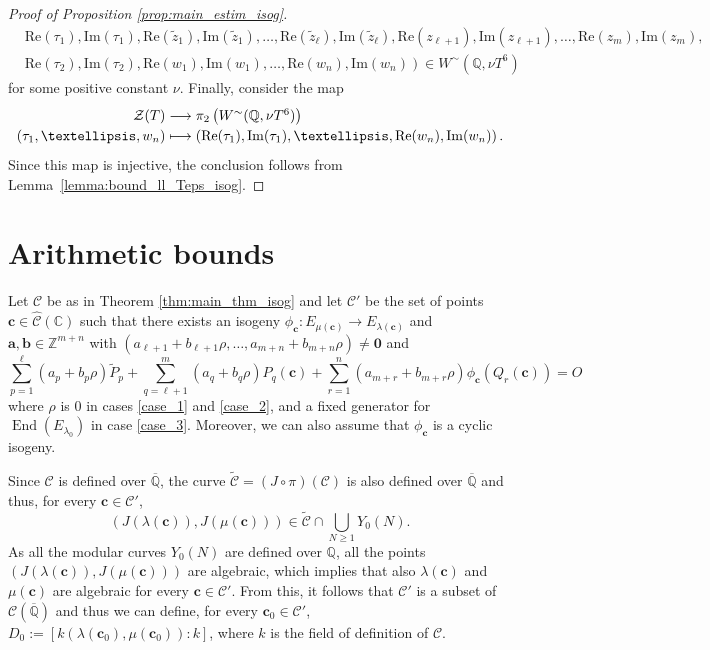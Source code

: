 \documentclass[11pt,a4paper,reqno]{amsart}
\numberwithin{equation}{section}
\newcommand{\Z}{\mathbb{Z}}
\newcommand{\Q}{\mathbb{Q}}
\newcommand{\C}{\mathbb{C}}
\newcommand{\Qal}{\overline{\mathbb{Q}}}
\renewcommand{\c}{\mathcal{C}}
\newcommand{\cc}{\mathbf{c}}
\renewcommand{\l}{\lambda}
\newcommand{\m}{\mu}
\renewcommand{\r}{\rho}
\newcommand{\pt}[1]{\left( #1 \right)}
\newcommand{\pq}[1]{\left[ #1 \right]}
\renewcommand{\Im}{\mathrm{Im}}
\renewcommand{\Re}{\mathrm{Re}}
\DeclareMathOperator{\en}{End}
\theoremstyle{remark}
\theoremstyle{definition}
\theoremstyle{definition}
\begin{document}
\begin{proof}[Proof of Proposition \ref{prop:main_estim_isog}]
\begin{align*}
& \left. \Re(\tau_1), \Im(\tau_1), \Re(\widetilde{z}_1), \Im(\widetilde{z}_1), \ldots, \Re(\widetilde{z}_{\ell}), \Im(\widetilde{z}_{\ell}), \Re(z_{\ell+1}), \Im(z_{\ell+1}), \ldots, \Re(z_m), \Im(z_m), \right.\\  
& \left. \Re(\tau_2), \Im(\tau_2), \Re(w_1), \Im(w_1), \ldots, \Re(w_n), \Im(w_n)\right) \in W^{\sim} (\Q, \nu T^6)
\end{align*} 
for some positive constant $\nu$.  
Finally, consider the map 
$$\setlength{\arraycolsep}{0pt}
\renewcommand{\arraystretch}{1.2}
  \begin{array}{ r c l }
    \mathcal{Z}(T) & {} \longrightarrow {} & \pi_2\pt{W^{\sim} (\Q, \nu T^6)}\\
     (\tau_1, \ldots, w_n)      & {} \longmapsto {} & \pt{\Re(\tau_1), \Im(\tau_1), \ldots, \Re(w_n), \Im(w_n)}.
  \end{array}$$
Since this map is injective, the conclusion follows from Lemma~\ref{lemma:bound_ll_Teps_isog}.
\end{proof}

\section{Arithmetic bounds}
Let $\c$ be as in Theorem \ref{thm:main_thm_isog} and let $\c'$ be the set of points $\cc \in \widehat{\c}(\C)$ such that there exists an isogeny $\phi_{\cc}:E_{\m(\cc)}\rightarrow E_{\l(\cc)}$ and $\mathbf{a}, \mathbf{b} \in \Z^{m+n}$ with $(a_{\ell+1}+b_{\ell+1} \r, \ldots, a_{m+n}+ b_{m+n}\r)\neq \mathbf{0}$ and
$$\sum\limits_{p=1}^{\ell} (a_p +b_p \r)\widetilde{P}_p + \sum\limits_{q=\ell+1}^{m} (a_q +b_q \r)P_q(\cc) + \sum\limits_{r=1}^{n} (a_{m+r}+b_{m+r}\r) \phi_{\cc}(Q_r(\cc))=O$$
where $\r$ is 0 in cases \ref{case_1} and \ref{case_2}, and a fixed generator for $\en(E_{\l_0})$ in case \ref{case_3}. Moreover, we can also assume that $\phi_{\cc}$ is a cyclic isogeny.

Since $\c$ is defined over $\Qal$, the curve $\widetilde{\c}=(J \circ \pi)(\c)$ is also defined over $\Qal$ and thus, for every $\cc \in \c'$, 
$$\pt{J(\l(\cc)),J(\m(\cc))} \in \widetilde{\c} \cap \bigcup_{N\geq 1} Y_0(N).$$
As all the modular curves $Y_0(N)$ are defined over $\Q$, all the points $\pt{J(\l(\cc)),J(\m(\cc))}$ are algebraic, which implies that also $\l(\cc)$ and $\m(\cc)$ are algebraic for every $\cc \in \c'$. From this, it follows that $\c'$ is a subset of $\c(\Qal)$ and thus we can define, for every $\cc_0 \in \c'$, $D_0:=\pq{k(\l(\cc_0),\m(\cc_0)):k}$, where $k$ is the field of definition of $\c$. 
\end{document}
